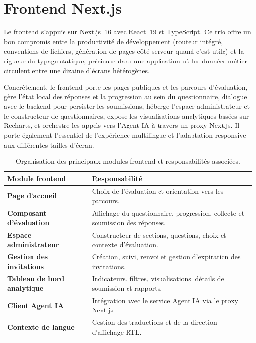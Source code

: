 \documentclass[12pt,a4paper]{report}
\begin{document}
\section{Frontend Next.js}
Le frontend s'appuie sur Next.js~16 avec React~19 et TypeScript. Ce trio offre un bon compromis entre la productivité de développement (routeur intégré, conventions de fichiers, génération de pages côté serveur quand c'est utile) et la rigueur du typage statique, précieuse dans une application où les données métier circulent entre une dizaine d'écrans hétérogènes.

Concrètement, le frontend porte les pages publiques et les parcours d'évaluation, gère l'état local des réponses et la progression au sein du questionnaire, dialogue avec le backend pour persister les soumissions, héberge l'espace administrateur et le constructeur de questionnaires, expose les visualisations analytiques basées sur Recharts, et orchestre les appels vers l'Agent IA à travers un proxy Next.js. Il porte également l'essentiel de l'expérience multilingue et l'adaptation responsive aux différentes tailles d'écran.

\begin{table}[H]
\centering
\caption{Organisation des principaux modules frontend et responsabilités associées.}
\begin{tabularx}{\textwidth}{>{\bfseries}L{4.7cm}Y}
\toprule
Module frontend & Responsabilité \\
\midrule
Page d'accueil & Choix de l'évaluation et orientation vers les parcours. \\
Composant d'évaluation & Affichage du questionnaire, progression, collecte et soumission des réponses. \\
Espace administrateur & Constructeur de sections, questions, choix et contexte d'évaluation. \\
Gestion des invitations & Création, suivi, renvoi et gestion d'expiration des invitations. \\
Tableau de bord analytique & Indicateurs, filtres, visualisations, détails de soumission et rapports. \\
Client Agent IA & Intégration avec le service Agent IA via le proxy Next.js. \\
Contexte de langue & Gestion des traductions et de la direction d'affichage RTL. \\
\bottomrule
\end{tabularx}
\label{tab:frontend-modules}
\end{table}
\end{document}
